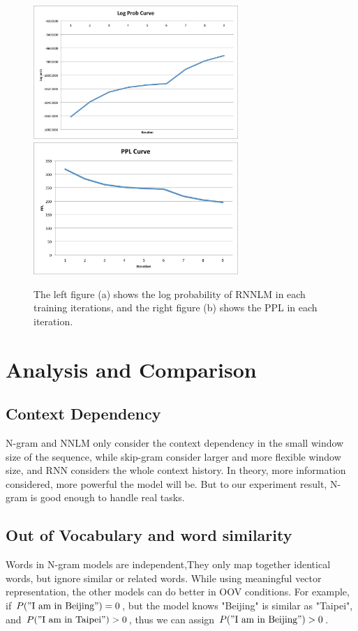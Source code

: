 \documentclass[11pt, oneside]{article}   	%
\begin{document}
\begin{figure}
\includegraphics[width=220pt]{1.jpg}
\includegraphics[width=220pt]{2.jpg}
\caption{The left figure (a) shows the log probability of RNNLM in each training iterations, and the right figure (b) shows the PPL in each iteration.}
\end{figure}
\section{Analysis and Comparison}
\subsection{Context Dependency}
N-gram and NNLM only consider the context dependency in the small window size of the sequence, while skip-gram consider larger and more flexible window size, and RNN considers the whole context history. In theory, more information considered, more powerful the model will be. But to our experiment result, N-gram is good enough to handle real tasks.
\subsection{Out of Vocabulary and word similarity}
Words in N-gram models are independent,They only map together identical words, but ignore similar or related words. While using meaningful vector representation, the other models can do better in OOV conditions. For example, if $P("\text{I am in Beijing}") =0 $, but the model knows "Beijing" is similar as "Taipei", and $P("\text{I am in Taipei}") >0 $, thus we can assign $P("\text{I am in Beijing}") >0 $.
\end{document}
